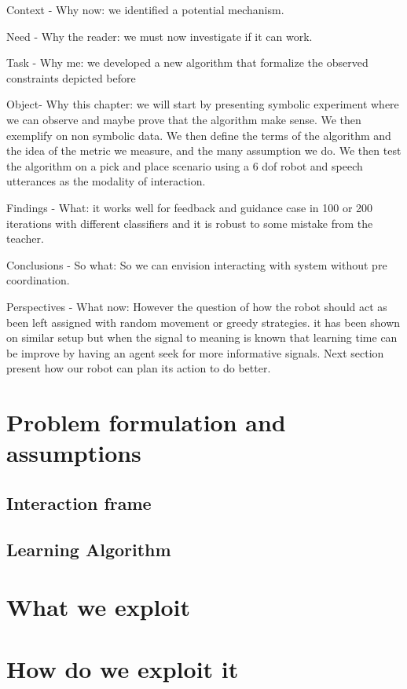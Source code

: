 Context - Why now: we identified a potential mechanism.

Need - Why the reader: we must now investigate if it can work.

Task - Why me: we developed a new algorithm that formalize the observed constraints depicted before

Object- Why this chapter:  we will start by presenting symbolic experiment where we can observe and maybe prove that the algorithm make sense. We then exemplify on non symbolic data. We then define the terms of the algorithm and the idea of the metric we measure, and the many assumption we do. We then test the algorithm on a pick and place scenario using a 6 dof robot and speech utterances as the modality of interaction.

Findings - What: it works well for feedback and guidance case in 100 or 200 iterations with different classifiers and it is robust to some mistake from the teacher.

Conclusions - So what: So we can envision interacting with system without pre coordination. 

Perspectives - What now: However the question of how the robot should act as been left assigned with random movement or greedy strategies. it has been shown on similar setup but when the signal to meaning is known that learning time can be improve by having an agent seek for more informative signals. Next section present how our robot can plan its action to do better.

\section{Problem formulation and assumptions}

\subsection{Interaction frame}

\subsection{Learning Algorithm}

\section{What we exploit}

\section{How do we exploit it}

